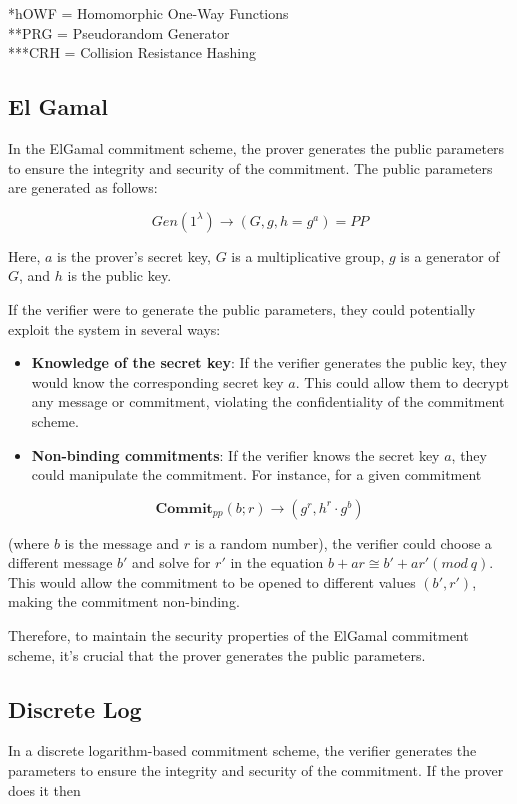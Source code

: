 \documentclass{article}
\begin{document}
*hOWF = Homomorphic One-Way Functions \\
**PRG = Pseudorandom Generator \\
***CRH = Collision Resistance Hashing

\subsection{El Gamal}

In the ElGamal commitment scheme, the prover generates the public parameters to ensure the integrity and security of the commitment. The public parameters are generated as follows:

$$
Gen(1^\lambda) \rightarrow (G,g,h = g^a) = PP
$$

Here, $a$ is the prover's secret key, $G$ is a multiplicative group, $g$ is a generator of $G$, and $h$ is the public key.

If the verifier were to generate the public parameters, they could potentially exploit the system in several ways:

\begin{itemize}
    \item \textbf{Knowledge of the secret key}: If the verifier generates the public key, they would know the corresponding secret key $a$. This could allow them to decrypt any message or commitment, violating the confidentiality of the commitment scheme.
    \item \textbf{Non-binding commitments}: If the verifier knows the secret key $a$, they could manipulate the commitment. For instance, for a given commitment
\end{itemize}

$$
\mathbf{Commit}_{pp}(b;r) \rightarrow (g^r, h^r \cdot g^b)
$$

(where $b$ is the message and $r$ is a random number), the verifier could choose a different message $b'$ and solve for $r'$ in the equation $b + ar \cong b' + ar' (mod \: q)$. This would allow the commitment to be opened to different values $(b', r')$, making the commitment non-binding.

Therefore, to maintain the security properties of the ElGamal commitment scheme, it's crucial that the prover generates the public parameters.

\subsection{Discrete Log}

In a discrete logarithm-based commitment scheme, the verifier generates the parameters to ensure the integrity and security of the commitment. If the prover does it then
\end{document}
